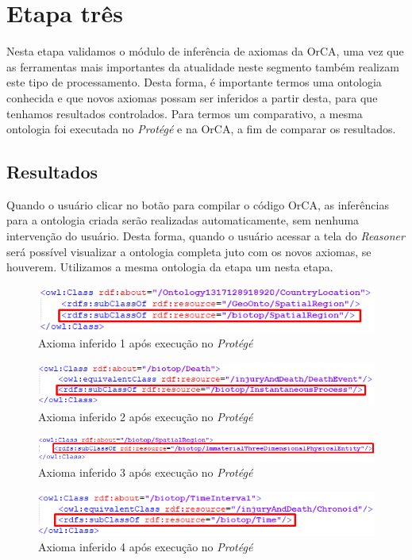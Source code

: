 \documentclass{bcc}
\begin{document}
\section{Etapa três}
Nesta etapa validamos o módulo de inferência de axiomas da OrCA, uma vez que as ferramentas mais importantes da atualidade neste segmento também realizam este tipo de processamento. Desta forma, é importante termos uma ontologia conhecida e que novos axiomas possam ser inferidos a partir desta, para que tenhamos resultados controlados. Para termos um comparativo, a mesma ontologia foi executada no \textit{Protégé} e na OrCA, a fim de comparar os resultados.


\subsection{Resultados}
Quando o usuário clicar no botão para compilar o código OrCA, as inferências para a ontologia criada serão realizadas automaticamente, sem nenhuma intervenção do usuário. Desta forma, quando o usuário acessar a tela do \textit{Reasoner} será possível visualizar a ontologia completa juto com os novos axiomas, se houverem. Utilizamos a mesma ontologia da etapa um nesta etapa. 

\begin{figure}[H]
\centering
\includegraphics[width=.7\textwidth]{Figuras/e3_axioma1.png}
\caption{Axioma inferido 1 após execução no \textit{Protégé}} 
\label{fig:e3_axioma1}
\end{figure}
\begin{figure}[H]
\centering
\includegraphics[width=.7\textwidth]{Figuras/e3_axioma2.png}
\caption{Axioma inferido 2 após execução no \textit{Protégé}} 
\label{fig:e3_axioma2}
\end{figure}
\begin{figure}[H]
\centering
\includegraphics[width=.8\textwidth]{Figuras/e3_axioma3.png}
\caption{Axioma inferido 3 após execução no \textit{Protégé}} 
\label{fig:e3_axioma3}
\end{figure}
\begin{figure}[H]
\centering
\includegraphics[width=.7\textwidth]{Figuras/e3_axioma4.png}
\caption{Axioma inferido 4 após execução no \textit{Protégé}} 
\label{fig:e3_axioma4}
\end{figure}
\end{document}
